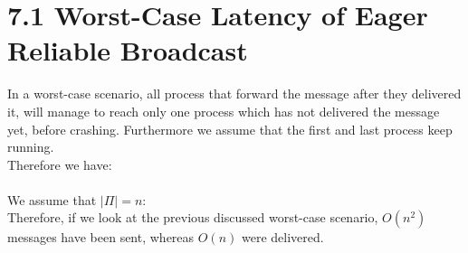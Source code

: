 \documentclass{article}
\begin{document}
	\pagestyle{fancy}
	\section*{7.1 Worst-Case Latency of Eager Reliable Broadcast}
	\begin{adjustwidth}{2em}{2em}
		In a worst-case scenario, all process that forward the message after they delivered it, will manage to reach only one process which has not delivered the message yet, before crashing. Furthermore we assume that the first and last process keep running. \\
		Therefore we have: \\ \\
		We assume that $\mid \Pi \mid = n$: \\
		Therefore, if we look at the previous discussed worst-case scenario, $O(n^2)$ messages have been sent, whereas $O(n)$ were delivered.
	\end{adjustwidth}
	
\end{document}
